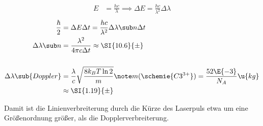 \documentclass[ex]{exercise_4.1}
\begin{document}
\dottedlinete

\begin{align*}
    E &= \frac{hc}{\lambda}\implies \Delta E = \frac{hc}{\lambda^2}\Delta\lambda
\end{align*}
\begin{align*}
    \frac{\hbar}{2} &= \Delta E \Delta t = \frac{hc}{\lambda^2}\Delta\lambda\sub n \Delta t \\
    \Delta \lambda\sub n &= \frac{\lambda^2}{4\pi c \Delta t }
    \approx \SI{10.6}{\pm}\\
    \\
    \Delta  \lambda\sub{Doppler} 
    &= \frac{\lambda}{c} \sqrt{\frac{8 k_B T \ln 2}{m}}
    \note m(\schemie{C3^{3+}}) = \frac{52\E {-3}}{N_A}\u{kg}\\
    &\approx \SI{1.19}{\pm}
\end{align*}

Damit ist die Linienverbreiterung durch die Kürze des Laserpuls etwa um eine Größenordnung größer, als die Dopplerverbreiterung.

\begin{align*}
\end{align*}

\subsection{}
\begin{align*}
\end{align*}
\end{document}
